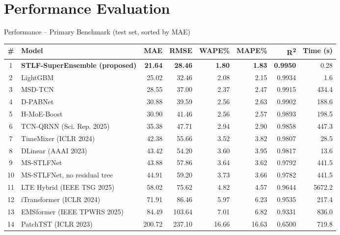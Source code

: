 \documentclass[aspectratio=169]{beamer}
\begin{document}
\section{Performance Evaluation}
\begin{frame}{Performance -- Primary Benchmark (test set, sorted by MAE)}
  \centering
  \tiny
  \setlength{\tabcolsep}{4pt}
  \begin{tabular}{clrrrrrr}
    \toprule
    \textbf{\#} & \textbf{Model} & \textbf{MAE} & \textbf{RMSE} & \textbf{WAPE\%} & \textbf{MAPE\%} & \textbf{R\textsuperscript{2}} & \textbf{Time (s)} \\ \midrule
    \rowcolor{championhighlight}
    1 & \textbf{STLF-SuperEnsemble (proposed)} & \textbf{21.64} & \textbf{28.46} & \textbf{1.80} & \textbf{1.83} & \textbf{0.9950} & 0.28 \\
    2 & LightGBM & 25.02 & 32.46 & 2.08 & 2.15 & 0.9934 & 1.6 \\
    3 & MSD-TCN & 28.55 & 37.00 & 2.37 & 2.47 & 0.9915 & 434.4 \\
    4 & D-PABNet & 30.88 & 39.59 & 2.56 & 2.63 & 0.9902 & 188.6 \\
    5 & H-MoE-Boost & 30.90 & 41.46 & 2.56 & 2.57 & 0.9893 & 198.5 \\
    6 & TCN-QRNN (Sci. Rep. 2025) & 35.38 & 47.71 & 2.94 & 2.90 & 0.9858 & 447.3 \\
    7 & TimeMixer (ICLR 2024) & 42.38 & 55.66 & 3.52 & 3.82 & 0.9807 & 28.5 \\
    8 & DLinear (AAAI 2023) & 43.42 & 54.20 & 3.60 & 3.95 & 0.9817 & 13.6 \\
    9 & MS-STLFNet & 43.88 & 57.86 & 3.64 & 3.62 & 0.9792 & 441.5 \\
    10 & MS-STLFNet, no residual tree & 44.91 & 59.20 & 3.73 & 3.66 & 0.9782 & 441.5 \\
    11 & LTE Hybrid (IEEE TSG 2025) & 58.02 & 75.62 & 4.82 & 4.57 & 0.9644 & 5672.2 \\
    12 & iTransformer (ICLR 2024) & 71.91 & 86.46 & 5.97 & 6.23 & 0.9535 & 217.4 \\
    13 & EMSformer (IEEE TPWRS 2025) & 84.49 & 103.64 & 7.01 & 6.82 & 0.9331 & 836.0 \\
    14 & PatchTST (ICLR 2023) & 200.72 & 237.10 & 16.66 & 16.63 & 0.6500 & 719.8 \\ \bottomrule
  \end{tabular}
\end{frame}
\end{document}

